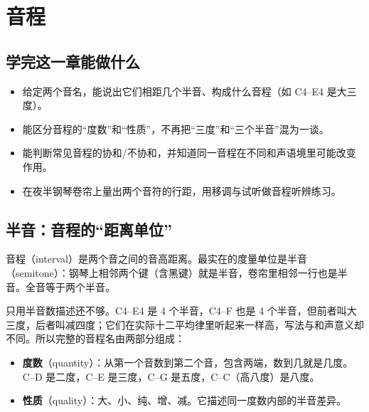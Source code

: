 \chapter{音程}


\label{sec:intervals}

\section*{学完这一章能做什么}
\begin{itemize}
  \item 给定两个音名，能说出它们相距几个半音、构成什么音程（如 C4–E4 是大三度）。
  \item 能区分音程的“度数”和“性质”，不再把“三度”和“三个半音”混为一谈。
  \item 能判断常见音程的协和/不协和，并知道同一音程在不同和声语境里可能改变作用。
  \item 在夜半钢琴卷帘上量出两个音符的行距，用移调与试听做音程听辨练习。
\end{itemize}

\section{半音：音程的“距离单位”}

音程（interval）是两个音之间的音高距离。最实在的度量单位是半音（semitone）：钢琴上相邻两个键（含黑键）就是半音，卷帘里相邻一行也是半音。全音等于两个半音。

只用半音数描述还不够。C4–E4 是 4 个半音，C4–F 也是 4 个半音，但前者叫大三度，后者叫减四度；它们在实际十二平均律里听起来一样高，写法与和声意义却不同。所以完整的音程名由两部分组成：

\begin{itemize}
  \item \textbf{度数}（quantity）：从第一个音数到第二个音，包含两端，数到几就是几度。C–D 是二度，C–E 是三度，C–G 是五度，C–C（高八度）是八度。
  \item \textbf{性质}（quality）：大、小、纯、增、减。它描述同一度数内部的半音差异。
\end{itemize}

